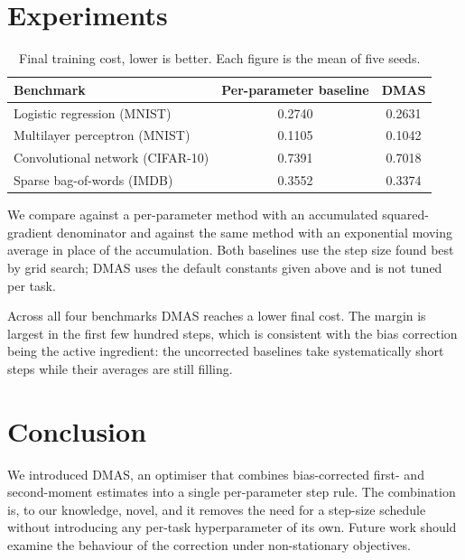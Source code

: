 \documentclass{article}
\begin{document}
\section{Experiments}

\begin{table}[t]
\centering
\begin{tabular}{lcc}
\toprule
Benchmark & Per-parameter baseline & DMAS \\
\midrule
Logistic regression (MNIST) & 0.2740 & 0.2631 \\
Multilayer perceptron (MNIST) & 0.1105 & 0.1042 \\
Convolutional network (CIFAR-10) & 0.7391 & 0.7018 \\
Sparse bag-of-words (IMDB) & 0.3552 & 0.3374 \\
\bottomrule
\end{tabular}
\caption{Final training cost, lower is better. Each figure is the mean of
five seeds.}
\end{table}

We compare against a per-parameter method with an accumulated squared-gradient
denominator and against the same method with an exponential moving average in
place of the accumulation. Both baselines use the step size found best by grid
search; DMAS uses the default constants given above and is not tuned per task.

Across all four benchmarks DMAS reaches a lower final cost. The margin is
largest in the first few hundred steps, which is consistent with the bias
correction being the active ingredient: the uncorrected baselines take
systematically short steps while their averages are still filling.

\section{Conclusion}

We introduced DMAS, an optimiser that combines bias-corrected first- and
second-moment estimates into a single per-parameter step rule. The combination
is, to our knowledge, novel, and it removes the need for a step-size schedule
without introducing any per-task hyperparameter of its own. Future work should
examine the behaviour of the correction under non-stationary objectives.



\end{document}
